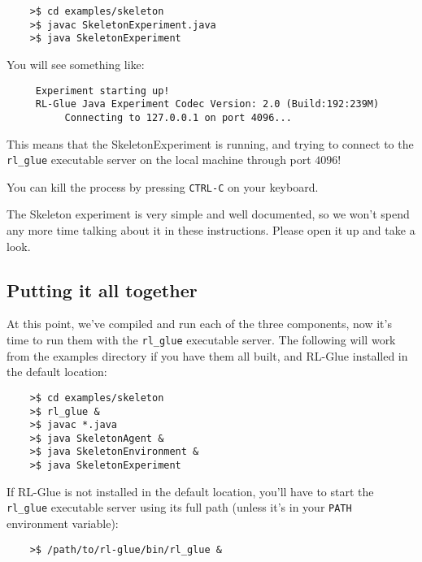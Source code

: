 \documentclass[11pt]{article}
\begin{document}
\begin{verbatim}
	>$ cd examples/skeleton
	>$ javac SkeletonExperiment.java
	>$ java SkeletonExperiment
\end{verbatim}

You will see something like:
\begin{verbatim}
     Experiment starting up!
     RL-Glue Java Experiment Codec Version: 2.0 (Build:192:239M)
          Connecting to 127.0.0.1 on port 4096...
\end{verbatim}

This means that the SkeletonExperiment is running, and trying to connect to the \texttt{rl\_glue} executable server on the local machine through port $4096$!  

You can kill the process by pressing \texttt{CTRL-C} on your keyboard.


The Skeleton experiment is very simple and well documented, so we won't spend any more time talking about it in these instructions.
Please open it up and take a look.


\subsection{Putting it all together}
At this point, we've compiled and run each of the three components, now it's time to run them with the \texttt{rl\_glue} executable server.  The following will work from the examples 
directory if you have them all built, and RL-Glue installed in the default location:
\begin{verbatim}
	>$ cd examples/skeleton
	>$ rl_glue &
	>$ javac *.java
	>$ java SkeletonAgent &
	>$ java SkeletonEnvironment &
	>$ java SkeletonExperiment
\end{verbatim}

If RL-Glue is not installed in the default location, you'll have to start the \texttt{rl\_glue} executable server using its full path (unless it's in your \texttt{PATH} environment variable):
\begin{verbatim}
	>$ /path/to/rl-glue/bin/rl_glue &
\end{verbatim}
\end{document}
